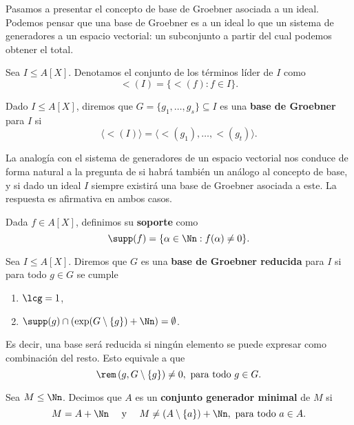 Pasamos a presentar el concepto de base de Groebner asociada a un ideal. Podemos pensar que una base de Groebner es a un ideal lo que un sistema de generadores a un espacio vectorial: un subconjunto a partir del cual podemos obtener el total.
\begin{definicion}
    Sea $I\le A[X]$. Denotamos el conjunto de los términos líder de $I$ como
    \begin{equation*}
        \lt(I) = \{\lt(f) : f\in I\}.
    \end{equation*}
\end{definicion}

\begin{definicion}
    Dado $I\le A[X]$, diremos que $G = \{g_1,\dots, g_s\}\subseteq I$ es una \textbf{base de Groebner} para $I$ si 
    $$\langle \lt(I)\rangle = \langle \lt(g_1),\dots, \lt(g_t) \rangle.$$
\end{definicion}

La analogía con el sistema de generadores de un espacio vectorial nos conduce de forma natural a la pregunta de si habrá también un análogo al concepto de base, y si dado un ideal $I$ siempre existirá una base de Groebner asociada a este. La respuesta es afirmativa en ambos casos.
\begin{definicion}
    Dada $f\in A[X]$, definimos su \textbf{soporte} como $$\supp(f) = \{ \alpha\in\Nn : f(\alpha) \neq 0\}.$$
\end{definicion}

\begin{definicion}
    Sea $I\le A[X]$. Diremos que $G$ es una \textbf{base de Groebner reducida} para $I$ si para todo $g\in G$ se cumple
    \begin{enumerate}
        \item $\lcg=1$,
        \item $\supp(g) \cap \left(\exp(G\setminus\{g\}) + \Nn \right) = \emptyset$.
    \end{enumerate}
    Es decir, una base será reducida si ningún elemento se puede expresar como combinación del resto. Esto equivale a que
    \begin{equation*}
        \rem\left(g, G\setminus \{g\}\right) \neq 0,\ \text{para todo } g\in G.
    \end{equation*}
\end{definicion}

\begin{definicion}
    Sea $M\le \Nn$. Decimos que $A$ es un \textbf{conjunto generador minimal} de $M$ si
    \begin{equation*}
        M = A + \Nn \quad \text{ y } \quad M\neq (A\setminus \{a\}) + \Nn,\ \text{para todo } a \in A.
    \end{equation*}
\end{definicion}

